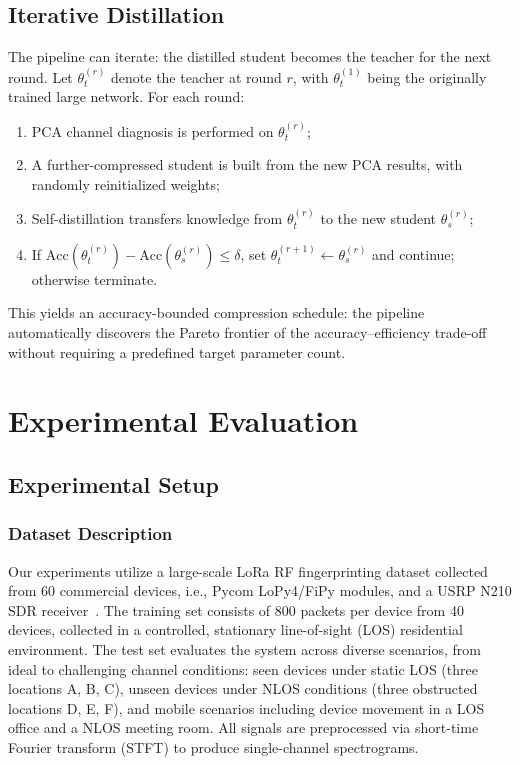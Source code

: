 \documentclass[10pt, conference]{IEEEtran}
\begin{document}
\subsection{Iterative Distillation}

The pipeline can iterate: the distilled student becomes the teacher for the next round.
Let $\theta_t^{(r)}$ denote the teacher at round $r$, with $\theta_t^{(1)}$ being the originally trained large network.
For each round:
\begin{enumerate}
    \item PCA channel diagnosis is performed on $\theta_t^{(r)}$;
    \item A further-compressed student is built from the new PCA results, with randomly reinitialized weights;
    \item Self-distillation transfers knowledge from $\theta_t^{(r)}$ to the new student $\theta_s^{(r)}$;
    \item If $\text{Acc}(\theta_t^{(r)}) - \text{Acc}(\theta_s^{(r)}) \le \delta$, set $\theta_t^{(r+1)} \leftarrow \theta_s^{(r)}$ and continue; otherwise terminate.
\end{enumerate}
This yields an accuracy-bounded compression schedule: the pipeline automatically discovers the Pareto frontier of the accuracy--efficiency trade-off without requiring a predefined target parameter count.


\section{Experimental Evaluation}
\label{sec:experimental_evaluation}

\subsection{Experimental Setup}
\label{subsec:experimental_setup}

\subsubsection{Dataset Description}
\label{subsubsec:dataset_description}

Our experiments utilize a large-scale LoRa RF fingerprinting dataset collected from 60 commercial devices, i.e., Pycom LoPy4/FiPy modules, and a USRP N210 SDR receiver~\cite{shen2021towards}.
The training set consists of 800 packets per device from 40 devices, collected in a controlled, stationary line-of-sight (LOS) residential environment.
The test set evaluates the system across diverse scenarios, from ideal to challenging channel conditions: seen devices under static LOS (three locations A, B, C), unseen devices under NLOS conditions (three obstructed locations D, E, F), and mobile scenarios including device movement in a LOS office and a NLOS meeting room.
All signals are preprocessed via short-time Fourier transform (STFT) to produce single-channel spectrograms.
\end{document}
